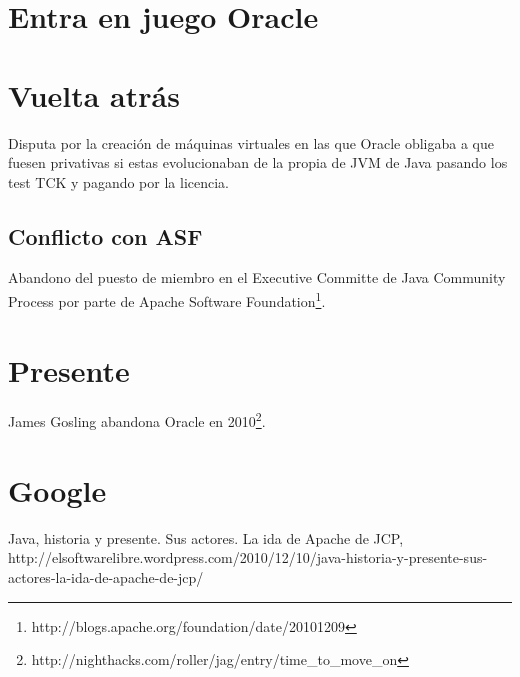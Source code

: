 \documentclass[11pt]{scrartcl}
\begin{document}
\section{Entra en juego Oracle}


\section{Vuelta atrás}

Disputa por la creación de máquinas virtuales en las que Oracle obligaba a que fuesen privativas si estas evolucionaban de la propia de JVM de Java pasando los test TCK y pagando por la licencia.

\subsection{Conflicto con ASF}

Abandono del puesto de miembro en el Executive Committe de Java Community Process por parte de Apache Software Foundation\footnote{http://blogs.apache.org/foundation/date/20101209}.

\section{Presente}

James Gosling abandona Oracle en 2010\footnote{http://nighthacks.com/roller/jag/entry/time\_to\_move\_on}.	

\section{Google}



\begin{thebibliography}{9}

        Java, historia y presente. Sus actores. La ida de Apache de JCP,\\
        http://elsoftwarelibre.wordpress.com/2010/12/10/java-historia-y-presente-sus-actores-la-ida-de-apache-de-jcp/
    
\end{thebibliography}
\end{document}
